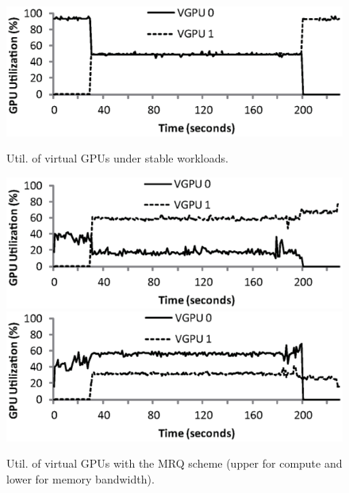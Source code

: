 \begin{figure}[t]
 \begin{center}
  \includegraphics[width=\hsize]{eps/vgpu_fair_2_band.eps}\\
  \vspace{-1.5em}
  \caption{Util. of virtual GPUs under stable workloads.}
  \label{fig:vgpu_fair_2_band}
 \end{center}
 \begin{center}
  \includegraphics[width=\hsize]{eps/vgpu_2_band_compute.eps}\\
  \vspace{-0.5em}
  \includegraphics[width=\hsize]{eps/vgpu_2_band_memory.eps}
  \vspace{-1.5em}
  \caption{Util. of virtual GPUs with the MRQ scheme (upper for compute
  and lower for memory bandwidth).}
  \label{fig:vgpu_fair_2_band}
 \end{center}
  \vspace{-2em}
\end{figure}
